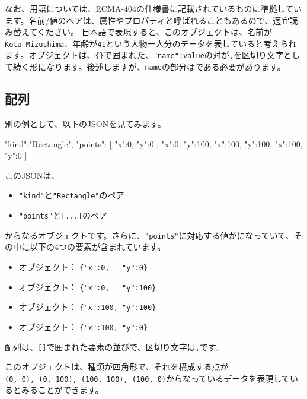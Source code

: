 なお、用語については、ECMA-404の仕様書に記載されているものに準拠しています。名前/値のペアは、属性やプロパティと呼ばれることもあるので、適宜読み替えてください。
日本語で表現すると、このオブジェクトは、名前が\texttt{Kota\ Mizushima}、年齢が\texttt{41}という人物一人分のデータを表していると考えられます。オブジェクトは、\texttt{\{\}}で囲まれた、\texttt{"name":value}の対が\texttt{,}を区切り文字として続く形になります。後述しますが、\texttt{name}の部分はである必要があります。

\subsection{配列}

別の例として、以下のJSONを見てみます。

\begin{codescreen}{}
{
  "kind":"Rectangle",
  "points": [
    {"x":0,   "y":0  },
    {"x":0,   "y":100},
    {"x":100, "y":100},
    {"x":100, "y":0  }
  ]
}
\end{codescreen}

このJSONは、

\begin{itemize}
\item
  \texttt{"kind"}と\texttt{"Rectangle"}のペア
\item
  \texttt{"points"}と\texttt{{[}...{]}}のペア
\end{itemize}

からなるオブジェクトです。さらに、\texttt{"points"}に対応する値がになっていて、その中に以下の4つの要素が含まれています。

\begin{itemize}
\item
  オブジェクト： \texttt{\{"x":0,\ \ \ "y":0\}}
\item
  オブジェクト： \texttt{\{"x":0,\ \ \ "y":100\}}
\item
  オブジェクト： \texttt{\{"x":100,\ "y":100\}}
\item
  オブジェクト： \texttt{\{"x":100,\ "y":0\}}
\end{itemize}

配列は、\texttt{{[}{]}}で囲まれた要素の並びで、区切り文字は\texttt{,}です。

\enlargethispage*{2\baselineskip}このオブジェクトは、種類が四角形で、それを構成する点が\texttt{(0,\ 0),\ (0,\ 100),\ (100,\ 100),\ (100,\ 0)}からなっているデータを表現しているとみることができます。

